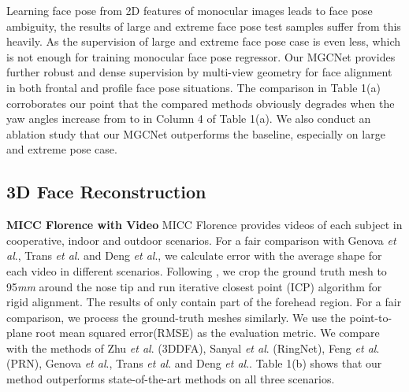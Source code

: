 \documentclass[runningheads]{llncs}
\newcommand{\etal}{\textit{et al}.}
\begin{document}
Learning face pose from 2D features of monocular images leads to face pose ambiguity, the results of large and extreme face pose test samples suffer from this heavily. As the supervision of large and extreme face pose case is even less, which is not enough for training monocular face pose regressor. 
Our MGCNet provides further robust and dense supervision by multi-view geometry for face alignment in both frontal and profile face pose situations.
The comparison in Table 1(a) corroborates our point that the compared methods \cite{dataset_aflw20003D_300WLP_zhu2016face,dataset_bulat2017far_lsw3d,super_fit_stn_bhagavatula2017faster,unsuper_zhou2019dense,super_fit_volu_exp_feng2018joint} obviously degrades when the yaw angles increase from  to  in Column 4 of Table 1(a).
We also conduct an ablation study that our MGCNet outperforms the baseline, especially on large and extreme pose case.


\subsection{3D Face Reconstruction}
\textbf{MICC Florence with Video}
MICC Florence provides videos of each subject in cooperative, indoor and outdoor scenarios. For a fair comparison with Genova \etal \cite{unsuper_genova2018unsupervised}, Trans \etal \cite{super_fit_endtoend_iter_tuan2017regressing} and Deng \etal \cite{unsuper_mul_ng2019accurate}, we calculate error with the average shape for each video in different scenarios.
Following \cite{unsuper_genova2018unsupervised}, we crop the ground truth mesh to 95\textit{mm} around the nose tip and run iterative closest point (ICP) algorithm for rigid alignment.
The results of \cite{super_fit_endtoend_iter_tuan2017regressing} only contain part of the forehead region. For a fair comparison, we process the ground-truth meshes similarly. We use the point-to-plane root mean squared error(RMSE) as the evaluation metric.
We compare with the methods of Zhu \etal \cite{dataset_aflw20003D_300WLP_zhu2016face} (3DDFA), Sanyal \etal \cite{unsuper_mul_sanyal2019learning_ring} (RingNet), Feng \etal \cite{super_fit_volu_exp_feng2018joint} (PRN), Genova \etal \cite{unsuper_genova2018unsupervised}, Trans \etal \cite{super_fit_endtoend_iter_tuan2017regressing} and Deng \etal \cite{unsuper_mul_ng2019accurate}. 
Table 1(b) shows that our method outperforms state-of-the-art methods \cite{dataset_aflw20003D_300WLP_zhu2016face, unsuper_mul_sanyal2019learning_ring,super_fit_volu_exp_feng2018joint,unsuper_genova2018unsupervised,super_fit_endtoend_iter_tuan2017regressing,unsuper_mul_ng2019accurate} on all three scenarios.
\end{document}
